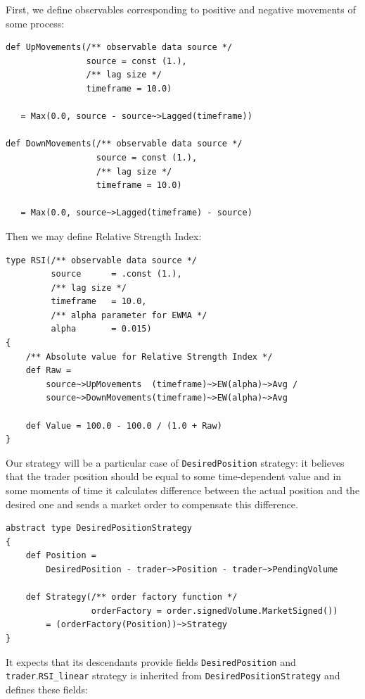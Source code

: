 \documentclass[a4paper,11pt]{article}
\begin{document}
First, we define observables corresponding to positive and negative movements of some process:

\begin{verbatim}
def UpMovements(/** observable data source */   
                source = const (1.),
                /** lag size */                
                timeframe = 10.0)

   = Max(0.0, source - source~>Lagged(timeframe))

def DownMovements(/** observable data source */   
                  source = const (1.),
                  /** lag size */                 
                  timeframe = 10.0)

   = Max(0.0, source~>Lagged(timeframe) - source)
\end{verbatim}

Then we may define Relative Strength Index:

\begin{verbatim}
type RSI(/** observable data source */   
         source      = .const (1.),
         /** lag size */                 
         timeframe   = 10.0,
         /** alpha parameter for EWMA */ 
         alpha       = 0.015)
{
    /** Absolute value for Relative Strength Index */
    def Raw =
        source~>UpMovements  (timeframe)~>EW(alpha)~>Avg /
        source~>DownMovements(timeframe)~>EW(alpha)~>Avg

    def Value = 100.0 - 100.0 / (1.0 + Raw)
}
\end{verbatim}

Our strategy will be a particular case of  \texttt{DesiredPosition} strategy: it believes that the trader position should be equal to some time-dependent value and in some moments of time it calculates difference between the actual position and the desired one and sends a market order to compensate this difference. 

\begin{verbatim}
abstract type DesiredPositionStrategy
{
    def Position = 
        DesiredPosition - trader~>Position - trader~>PendingVolume

    def Strategy(/** order factory function */
                 orderFactory = order.signedVolume.MarketSigned()) 
        = (orderFactory(Position))~>Strategy
}
\end{verbatim}

It expects that its descendants provide fields \texttt{DesiredPosition} and \texttt{trader}.\texttt{RSI\_linear} strategy is inherited from \texttt{DesiredPositionStrategy} and defines these fields:
\end{document}

